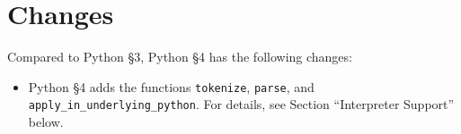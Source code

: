





\section{Changes}

Compared to Python \S 3, Python \S 4 has the following changes:
\begin{itemize}
  \item Python \S 4 adds the functions \lstinline{tokenize},
    \lstinline{parse}, and \lstinline{apply_in_underlying_python}.
    For details, see Section ``Interpreter Support'' below.
\end{itemize}


\newpage



































